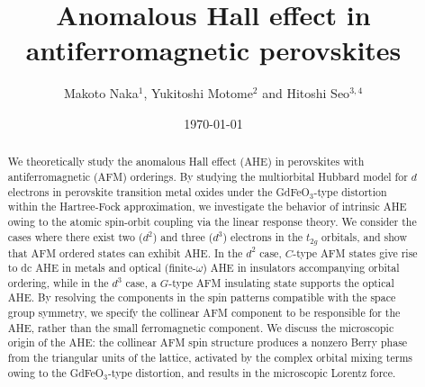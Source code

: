 \documentclass[aps,twocolumn,prb,preprintnumbers,amsmath,amssymb]{revtex4-2}
\begin{document}
\title{Anomalous Hall effect in antiferromagnetic perovskites}
\author{Makoto Naka$^{1}$, Yukitoshi Motome$^2$ and Hitoshi Seo$^{3,4}$}
\date{\today}
\begin{abstract}
We theoretically study the anomalous Hall effect (AHE) in perovskites with antiferromagnetic (AFM) orderings. 
By studying the multiorbital Hubbard model for $d$ electrons in perovskite transition metal oxides 
 under the GdFeO$_3$-type distortion within the Hartree-Fock approximation, 
 we investigate the behavior of intrinsic AHE owing to the atomic spin-orbit coupling via the linear response theory. 
We consider the cases where there exist two ($d^2$) and three ($d^3$) electrons in the $t_{2g}$ orbitals,  
 and show that AFM ordered states %
 can exhibit AHE. 
In the $d^2$ case, $C$-type AFM states give rise to dc AHE in metals and optical (finite-$\omega$) AHE in insulators accompanying orbital ordering, 
 while in the $d^3$ case,  a $G$-type AFM insulating state supports the optical AHE. 
By resolving the components in the spin patterns compatible with the space group symmetry, we specify the collinear AFM component to be responsible for the AHE, rather than the small ferromagnetic component. 
We discuss the microscopic origin of the AHE: 
the collinear AFM spin structure produces a nonzero Berry phase from the triangular units of the lattice,  
 activated by the complex orbital mixing terms owing to the GdFeO$_3$-type distortion,  
 and results in the microscopic Lorentz force.
\end{abstract} 
\end{document}
